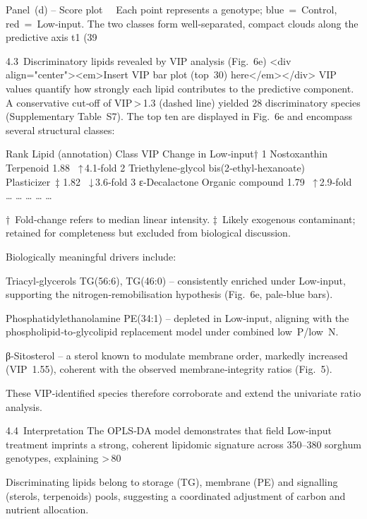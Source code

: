 \documentclass[10pt,letterpaper]{article}
\begin{document}
Panel (d) – Score plot 
Each point represents a genotype; blue = Control, red = Low‑input. The two classes form well‑separated, compact clouds along the predictive axis t1 (39 %

4.3 Discriminatory lipids revealed by VIP analysis (Fig. 6e)
<div align="center"><em>Insert VIP bar plot (top 30) here</em></div>
VIP values quantify how strongly each lipid contributes to the predictive component. A conservative cut‑off of VIP > 1.3 (dashed line) yielded 28 discriminatory species (Supplementary Table S7). The top ten are displayed in Fig. 6e and encompass several structural classes:

Rank	Lipid (annotation)	Class	VIP	Change in Low‑input†
1	Nostoxanthin	Terpenoid	1.88	 ↑ 4.1‑fold
2	Triethylene‑glycol bis(2‑ethyl‑hexanoate)	Plasticizer ‡	1.82	 ↓ 3.6‑fold
3	ε‑Decalactone	Organic compound	1.79	 ↑ 2.9‑fold
…	…	…	…	…

† Fold‑change refers to median linear intensity.
‡ Likely exogenous contaminant; retained for completeness but excluded from biological discussion.

Biologically meaningful drivers include:

Triacyl‑glycerols TG(56:6), TG(46:0) – consistently enriched under Low‑input, supporting the nitrogen‑remobilisation hypothesis (Fig. 6e, pale‑blue bars).

Phosphatidylethanolamine PE(34:1) – depleted in Low‑input, aligning with the phospholipid‑to‑glycolipid replacement model under combined low P/low N.

β‑Sitosterol – a sterol known to modulate membrane order, markedly increased (VIP 1.55), coherent with the observed membrane‑integrity ratios (Fig. 5).

These VIP‑identified species therefore corroborate and extend the univariate ratio analysis.

4.4 Interpretation
The OPLS‑DA model demonstrates that field Low‑input treatment imprints a strong, coherent lipidomic signature across 350–380 sorghum genotypes, explaining > 80 %

Discriminating lipids belong to storage (TG), membrane (PE) and signalling (sterols, terpenoids) pools, suggesting a coordinated adjustment of carbon and nutrient allocation.
\end{document}
